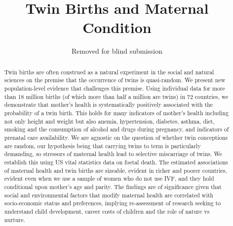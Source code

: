 \documentclass{nature}
\title{Twin Births and Maternal Condition}
\author{Removed for blind submission}
\begin{document}
\maketitle
\vspace{8mm}

\begin{linenumbers}  
\begin{abstract}
  
Twin births are often construed as a natural experiment in the social and natural sciences on the premise that the occurrence of twins is quasi-random.\cite{Thorndike1905,Boomsmaetal2002,Poldermanetal2015,Phillips1993,BouchardPropping1993,McClearnetal1997,Nisen2013,WolpinRosenzweig2000,RosenzweigWolpin1980,BronarsGrogger1994} We present new population-level evidence that challenges this premise. Using individual data for more than 18 million births (of which more than half a million are twins) in 72 countries, we demonstrate that mother's health is systematically positively associated with the probability of a twin birth. This holds for many indicators of mother's health including not only height and weight but also anemia, hypertension, diabetes, asthma, diet, smoking and the consumption of alcohol and drugs during pregnancy, and indicators of prenatal care availability. We are agnostic on the question of whether twin conceptions are random, our hypothesis being that carrying twins to term is particularly demanding, so stressors of maternal health lead to selective miscarriage of twins. We establish this using US vital statistics data on foetal death. The estimated associations of maternal health and twin births are sizeable, evident in richer and poorer countries, evident even when we use a sample of women who do not use IVF, and they hold conditional upon mother's age and parity. The findings are of significance given that social and environmental factors that modify maternal health are correlated with socio-economic status and preferences, implying re-assessment of research seeking to understand child development, career costs of children and the role of nature vs nurture.
\end{abstract}


\end{linenumbers}
\end{document}
